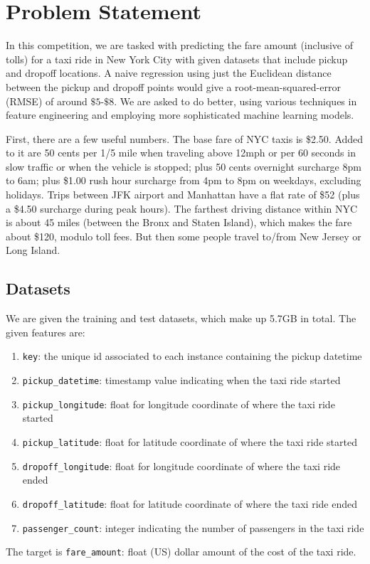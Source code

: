 \documentclass[12pt,letterpaper,final]{article}
\numberwithin{equation}{section}
\begin{document}



\section{Problem Statement}
In this competition, we are tasked with predicting the fare amount (inclusive of tolls) for a taxi ride in New York City with given datasets that include pickup and dropoff locations. A naive regression using just the Euclidean distance between the pickup and dropoff points would give a root-mean-squared-error (RMSE) of around $\$5$-$\$8$. We are asked to do better, using various techniques in feature engineering and employing more sophisticated machine learning models.

First, there are a few useful numbers. The base fare of NYC taxis is \$2.50. Added to it are 50 cents per 1/5 mile when traveling above 12mph or per 60 seconds in slow traffic or when the vehicle is stopped; plus 50 cents overnight surcharge 8pm to 6am; plus \$1.00 rush hour surcharge from 4pm to 8pm on weekdays, excluding holidays. Trips between JFK airport and Manhattan have a flat rate of \$52 (plus a \$4.50 surcharge during peak hours).  The farthest driving distance within NYC is about 45 miles (between the Bronx and Staten Island), which makes the fare about \$120, modulo toll fees. But then some people travel to/from New Jersey or Long Island. 

\subsection{Datasets}
We are given the training and test datasets, which make up 5.7GB in total. The given features are:
\begin{enumerate}
\item \verb|key|: the unique id associated to each instance containing the pickup datetime
\item \verb|pickup_datetime|: timestamp value indicating when the taxi ride started
\item \verb|pickup_longitude|: float for longitude coordinate of where the taxi ride started
\item \verb|pickup_latitude|: float for latitude coordinate of where the taxi ride started
\item \verb|dropoff_longitude|: float for longitude coordinate of where the taxi ride ended
\item \verb|dropoff_latitude|: float for latitude coordinate of where the taxi ride ended
\item \verb|passenger_count|: integer indicating the number of passengers in the taxi ride
\end{enumerate}
The target is \verb|fare_amount|: float (US) dollar amount of the cost of the taxi ride.
\end{document}
